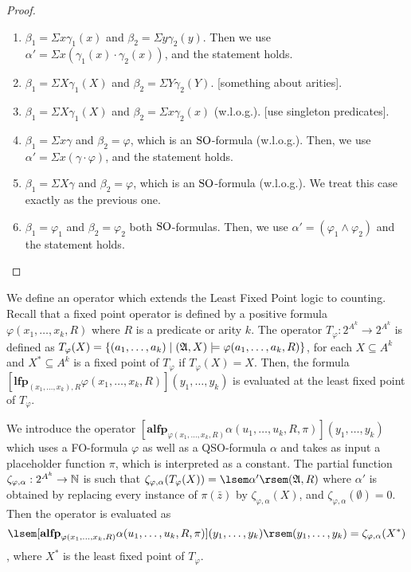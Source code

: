 \begin{proof}
\begin{enumerate}
		\begin{enumerate}
			\item $\beta_1 = \Sigma x \gamma_1(x)$ and $\beta_2 = \Sigma y \gamma_2(y)$. Then we use $\alpha' = \Sigma x(\gamma_1(x)\cdot\gamma_2(x))$, and the statement holds.
			\item $\beta_1 = \Sigma X \gamma_1(X)$ and $\beta_2 = \Sigma Y \gamma_2(Y)$. [something about arities].
			\item $\beta_1 = \Sigma X \gamma_1(X)$ and $\beta_2 = \Sigma x \gamma_2(x)$ (w.l.o.g.). [use singleton predicates].
			\item $\beta_1 = \Sigma x \gamma$ and $\beta_2 = \varphi$, which is an ${\rm SO}$-formula (w.l.o.g.). Then, we use $\alpha' = \Sigma x (\gamma \cdot \varphi)$, and the statement holds.
			\item $\beta_1 = \Sigma X \gamma$ and $\beta_2 = \varphi$, which is an ${\rm SO}$-formula (w.l.o.g.). We treat this case exactly as the previous one.
			\item $\beta_1 = \varphi_1$ and $\beta_2 = \varphi_2$ both ${\rm SO}$-formulas. Then, we use $\alpha' = (\varphi_1 \wedge \varphi_2)$ and the statement holds.
		\end{enumerate}
	\end{enumerate}
\end{proof}

We define an operator which extends the Least Fixed Point logic to counting. Recall that a fixed point operator is defined by a positive formula $\varphi(x_1,\ldots,x_k,R)$ where $R$ is a predicate or arity $k$. The operator $T_{\varphi}:2^{A^k} \to 2^{A^k}$ is defined as $T_{\varphi}(X) = \{(a_1,\ldots,a_k)\mid (\mathfrak{A},X)\models \varphi(a_1,\ldots,a_k,R) \}$, for each $X\subseteq A^k$ and $X^*\subseteq A^k$ is a fixed point of $T_{\varphi}$ if $T_{\varphi}(X) = X$. Then, the formula $[\textbf{lfp}_{(x_1,\ldots,x_k),R}\varphi(x_1,\ldots,x_k,R)](y_1,\ldots,y_k)$ is evaluated at the least fixed point of $T_{\varphi}$.

We introduce the operator $[\textbf{alfp}_{\varphi(x_1,\ldots,x_k,R)}\alpha(u_1,\ldots,u_k,R,\pi)](y_1,\ldots,y_k)$ which uses a FO-formula $\varphi$ as well as a QSO-formula $\alpha$ and takes as input a placeholder function $\pi$, which is interpreted as a constant. The partial function $\zeta_{\varphi,\alpha}:2^{A^k} \to \mathbb{N}$ is such that  $\zeta_{\varphi,\alpha}(T_{\varphi}(X)) = \sem{\alpha'}(\A,R)$ where $\alpha'$ is obtained by replacing every instance of $\pi(\bar{z})$ by $\zeta_{\varphi,\alpha}(X)$, and $\zeta_{\varphi,\alpha}(\emptyset) = 0$. Then the operator is evaluated as $$\sem{[\textbf{alfp}_{\varphi(x_1,\ldots,x_k,R)}\alpha(u_1,\ldots,u_k,R,\pi)](y_1,\ldots,y_k)}(y_1,\ldots,y_k) = \zeta_{\varphi,\alpha}(X^*)$$, where $X^*$ is the least fixed point of $T_{\varphi}$.

